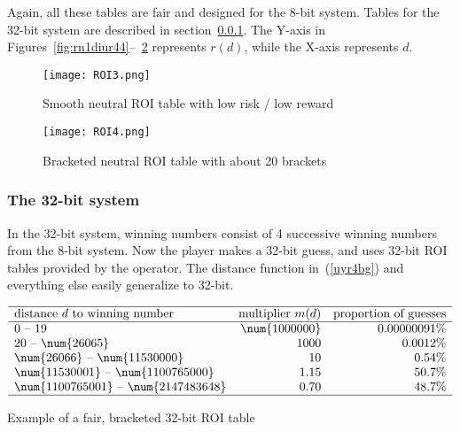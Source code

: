 \documentclass[oneside,10pt]{book}
\renewcommand{\arraystretch}{1.4} %
\begin{document}
Again, all these tables are fair and designed for the 8-bit system. Tables for the 32-bit system are described
 in section~\ref{32bitsre}. The Y-axis in Figures~\ref{fig:rn1diur44}--~\ref{fig:rn1dqwaswigyt} represents $r(d)$, while the X-axis represents $d$.

\begin{figure}[H]
\centering
\texttt{[image: ROI3.png]}
\caption{Smooth neutral ROI table with low risk / low reward}
\label{fig:rn1ffdsdigyt}
\end{figure}


\begin{figure}[H]
\centering
\texttt{[image: ROI4.png]}
\caption{Bracketed neutral ROI table with about 20 brackets}
\label{fig:rn1dqwaswigyt}
\end{figure}


\subsubsection{The 32-bit system}\label{32bitsre}

In the 32-bit system, winning numbers consist of 4 successive winning numbers from the 8-bit system. Now the player makes
 a 32-bit guess, and uses 32-bit ROI tables provided by the operator. The distance function in~(\ref{uyr4bg}) and everything else easily generalize to 32-bit.



\renewcommand{\arraystretch}{1.2} %
\begin{table}[H]
\[
\begin{array}{lrr}
\hline
\text{distance } d \text{ to winning number}	&  \text{multiplier } m(d)  & \text{proportion of guesses}\\
\hline
  0 \text{ -- } 19                             &  \num{1000000}   &  0.00000091\% \\
  20 \text{ -- } \num{26065}                      &   1000 &   0.0012\% \\
 \num{26066} \text{ -- }  \num{11530000} &    10  &   0.54\%\\
 \num{11530001} \text{ -- }  \num{1100765000}  & 1.15 &  50.7\%     \\
 \num{1100765001} \text{ -- }  \num{2147483648}  & 0.70 &  48.7\%   \\
\hline
\end{array}
\]
\caption{\label{taxzqa} Example of a fair, bracketed 32-bit ROI table}
\end{table}
\renewcommand{\arraystretch}{1.0} %
\end{document}
